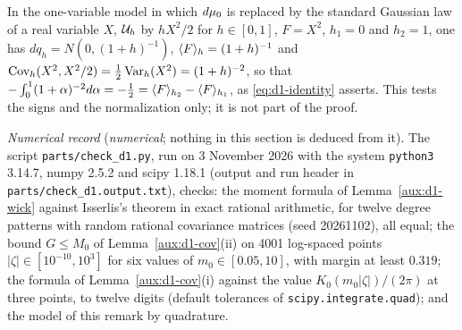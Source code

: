\begin{auxrem}\label{aux:d1-check}
In the one-variable model in which $d\mu_0$ is replaced by the standard Gaussian law of a real
variable $X$, $\mathcal U_h$ by $hX^2/2$ for $h\in[0,1]$, $F=X^2$, $h_1=0$ and $h_2=1$, one has
$dq_h=N(0,(1+h)^{-1})$, $\langle F\rangle_{h}=(1+h)^{-1}$ and
$\operatorname{Cov}_h(X^2,X^2/2)=\frac12\operatorname{Var}_h(X^2)=(1+h)^{-2}$, so that
$-\int_0^1(1+\alpha)^{-2}d\alpha=-\frac12=\langle F\rangle_{h_2}-\langle F\rangle_{h_1}$, as \eqref{eq:d1-identity}
asserts. This tests the signs and the normalization only; it is not part of the proof.

\emph{Numerical record} (\emph{numerical}; nothing in this section is deduced from it).  The script
\texttt{parts/check\_d1.py}, run on 3 November 2026 with the system \texttt{python3} 3.14.7, numpy
2.5.2 and scipy 1.18.1 (output and run header in \texttt{parts/}\allowbreak\texttt{check\_d1.output.txt}), checks: the moment
formula of Lemma~\ref{aux:d1-wick} against Isserlis's theorem in exact rational arithmetic, for
twelve degree patterns with random rational covariance matrices (seed 20261102), all equal; the
bound $G\le M_0$ of Lemma~\ref{aux:d1-cov}(ii) on 4001 log-spaced points
$|\zeta|\in[10^{-10},10^3]$ for six values of $m_0\in[0.05,10]$, with margin at least $0.319$; the
formula of Lemma~\ref{aux:d1-cov}(i) against the value $K_0(m_0|\zeta|)/(2\pi)$ at three points, to
twelve digits (default tolerances of \texttt{scipy.integrate.quad}); and the model of this remark by
quadrature.
\end{auxrem}
